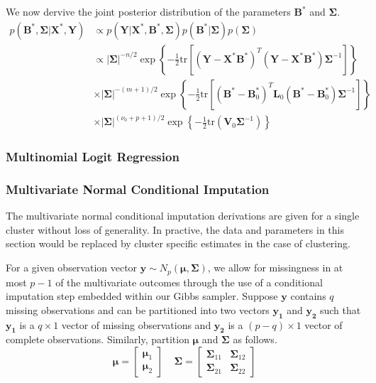 \documentclass[useAMS,referee]{biom}
\newcommand{\tr}{\mbox{tr}}
\begin{document}
We now dervive the joint posterior distribution of the parameters $\mathbf{B}^*$ and $\boldsymbol\Sigma$.
\begin{align*} 
p(\mathbf{B}^*,\boldsymbol\Sigma|\mathbf{X}^*,\mathbf{Y}) & \propto  p(\mathbf{Y}|\mathbf{X}^*,\mathbf{B}^*,\boldsymbol\Sigma)p(\mathbf{B}^*|\boldsymbol\Sigma)p(\boldsymbol\Sigma)\\
&  \propto |\boldsymbol\Sigma|^{-n/2}\exp \left \{ -\frac{1}{2} \tr \left [(\mathbf{Y} - \mathbf{X^*}\mathbf{B}^*)^T(\mathbf{Y} - \mathbf{X^*}\mathbf{B}^*)\boldsymbol\Sigma^{-1} \right ]\right \} \\
& \times |\boldsymbol\Sigma|^{-(m+1)/2} \exp \left \{ -\frac{1}{2} \tr \left [(\mathbf{B}^* - \mathbf{B}^*_0)^T \mathbf{L}_0(\mathbf{B}^* - \mathbf{B}^*_0)\boldsymbol\Sigma^{-1} \right ]\right \} \\
& \times |\boldsymbol\Sigma|^{(\nu_0 + p + 1)/2} \exp \left \{ -\frac{1}{2} \tr (\mathbf{V}_0 \boldsymbol\Sigma^{-1}) \right \}
\end{align*}



\subsubsection{Multinomial Logit Regression}

\subsubsection{Multivariate Normal Conditional Imputation}

The multivariate normal conditional imputation derivations are given for a single cluster without loss of generality. In practive, the data and parameters in this section would be replaced by cluster specific estimates in the case of clustering. 

For a given observation vector $\mathbf{y} \sim N_p(\boldsymbol\mu, \boldsymbol\Sigma)$, we allow for missingness in at most $p - 1$ of the multivariate outcomes through the use of a conditional imputation step embedded within our Gibbs sampler. Suppose $\mathbf{y}$ contains $q$ missing observations and can be partitioned into two vectors $\mathbf{y_{1}}$ and $\mathbf{y_{2}}$ such that $\mathbf{y_{1}}$ is a $q \times 1$ vector of missing observations and $\mathbf{y_{2}}$ is a $(p-q) \times 1$ vector of complete observations. Similarly, partition $\boldsymbol\mu$ and $\boldsymbol\Sigma$ as follows.
$$\boldsymbol\mu = \begin{bmatrix} \boldsymbol\mu_1 \\ \boldsymbol\mu_2 \end{bmatrix} \ \ \ \ \ \boldsymbol\Sigma = \begin{bmatrix} \boldsymbol\Sigma_{11} & \boldsymbol\Sigma_{12} \\ \boldsymbol\Sigma_{21} & \boldsymbol\Sigma_{22} \end{bmatrix}$$
\end{document}
